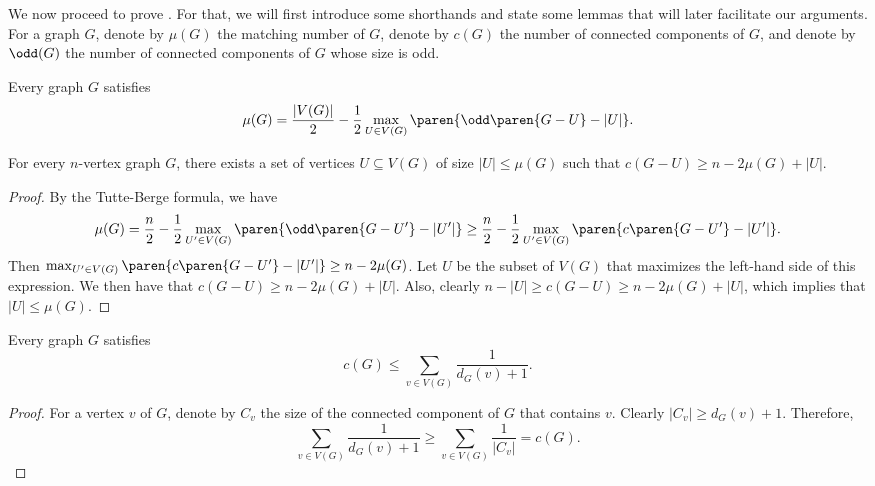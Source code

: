 \documentclass[10pt,a4paper,reqno]{amsart}
\begin{document}
We now proceed to prove . For that, we will first introduce some shorthands and state some lemmas that will later facilitate our arguments. For a graph $G$, denote by $\mu(G)$ the matching number of $G$, denote by $c(G)$ the number of connected components of $G$, and denote by $\odd(G)$ the number of connected components of $G$ whose size is odd. 
\begin{theorem}
    Every graph $G$ satisfies 
    \begin{equation*}
    \mu(G) = \frac{|V(G)|}{2} - \frac{1}{2}\max_{U \in V(G)} \paren{\odd\paren{G - U} - |U|}.
    \end{equation*}
\end{theorem}
\begin{lemma}\label{lem:tutte}
  For every $n$-vertex graph $G$, there exists a set of vertices $U \subseteq V(G)$ of size $|U| \leq \mu(G)$ such
  that $c(G - U) \geq n - 2\mu(G) + |U|$.
\end{lemma}
\begin{proof}
By the Tutte-Berge formula, we have
\begin{equation*}
    \mu(G) = \frac{n}{2} - \frac{1}{2}\max_{U' \in V(G)} \paren{\odd\paren{G - U'} - |U'|} \geq \frac{n}{2} - \frac{1}{2}\max_{U' \in V(G)} \paren{c\paren{G - U'} - |U'|}.
\end{equation*}
Then $\max_{U' \in V(G)} \paren{c\paren{G - U'} - |U'|} \geq n - 2\mu(G)$. Let $U$ be the subset of $V(G)$ that maximizes the left-hand side of this expression. We then have that $c(G - U) \geq n - 2\mu(G) + |U|$. Also, clearly $n - |U| \geq c(G - U) \geq n - 2\mu(G) + |U|$, which implies that $|U| \leq \mu(G)$.
\end{proof}

\begin{lemma}\label{lem:up_bound_components_inverse_degree}
  Every graph $G$ satisfies
  \begin{equation*}
    c(G) \leq \sum_{v \in V(G)} \frac{1}{d_G(v) + 1}.
  \end{equation*}
\end{lemma}
\begin{proof}
For a vertex $v$ of $G$, denote by $C_v$ the size of the connected component of $G$ that contains $v$. Clearly $|C_v|\geq d_G(v)+1$. Therefore,
\begin{equation*}
    \sum_{v \in V(G)} \frac{1}{d_G(v) + 1} \geq \sum_{v \in V(G)} \frac{1}{|C_v|} = c(G).
\end{equation*}
\end{proof}
\end{document}
